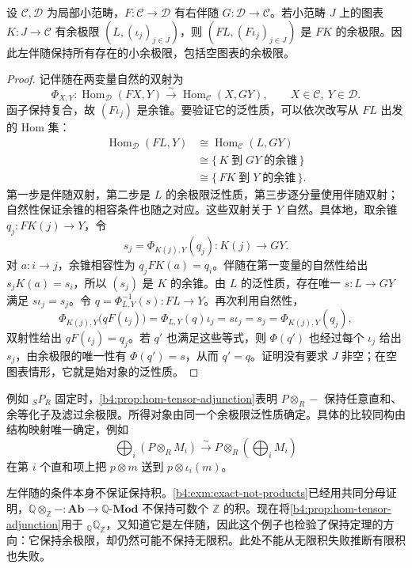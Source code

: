 \begin{theorem}\label{b4:thm:adjoints-preserve-colimits}
	设 \(\mathcal C,\mathcal D\) 为局部小范畴，\(F:\mathcal C\rightarrow\mathcal D\) 有右伴随 \(G:\mathcal D\rightarrow\mathcal C\)。若小范畴 \(J\) 上的图表 \(K:J\rightarrow\mathcal C\) 有余极限 \((L,(\iota_j)_{j\in J})\)，则 \((FL,(F\iota_j)_{j\in J})\) 是 \(FK\) 的余极限。因此左伴随保持所有存在的小余极限，包括空图表的余极限。
\end{theorem}
\begin{proof}
	记伴随在两变量自然的双射为
	\[
		\Phi_{X,Y}:\operatorname{Hom}_{\mathcal D}(FX,Y) \xrightarrow{\sim}\operatorname{Hom}_{\mathcal C}(X,GY), \qquad X\in\mathcal C,\ Y\in\mathcal D.
	\]
	函子保持复合，故 \((F\iota_j)\) 是余锥。要验证它的泛性质，可以依次改写从 \(FL\) 出发的 Hom 集：
	\[
		\begin{aligned}
			\operatorname{Hom}_{\mathcal D}(FL,Y) &\cong\operatorname{Hom}_{\mathcal C}(L,GY)\\
			&\cong\{\,K\;\text{到}\;GY\;\text{的余锥}\,\}\\
			&\cong\{\,FK\;\text{到}\;Y\;\text{的余锥}\,\}.
		\end{aligned}
	\]
	第一步是伴随双射，第二步是 \(L\) 的余极限泛性质，第三步逐分量使用伴随双射；自然性保证余锥的相容条件也随之对应。这些双射关于 \(Y\) 自然。具体地，取余锥 \(q_j:FK(j)\rightarrow Y\)，令
	\[
		s_j=\Phi_{K(j),Y}(q_j):K(j)\longrightarrow GY.
	\]
	对 \(a:i\rightarrow j\)，余锥相容性为 \(q_jFK(a)=q_i\)。伴随在第一变量的自然性给出 \(s_jK(a)=s_i\)，所以 \((s_j)\) 是 \(K\) 的余锥。由 \(L\) 的泛性质，存在唯一 \(s:L\rightarrow GY\) 满足 \(s\iota_j=s_j\)。令 \(q=\Phi^{-1}_{L,Y}(s):FL\rightarrow Y\)。再次利用自然性，
	\[
		\Phi_{K(j),Y}\bigl(qF(\iota_j)\bigr) =\Phi_{L,Y}(q)\iota_j=s\iota_j=s_j=\Phi_{K(j),Y}(q_j),
	\]
	双射性给出 \(qF(\iota_j)=q_j\)。若 \(q'\) 也满足这些等式，则 \(\Phi(q')\) 也经过每个 \(\iota_j\) 给出 \(s_j\)，由余极限的唯一性有 \(\Phi(q')=s\)，从而 \(q'=q\)。证明没有要求 \(J\) 非空；在空图表情形，它就是始对象的泛性质。
\end{proof}

例如 \({}_SP_R\) 固定时，\cref{b4:prop:hom-tensor-adjunction}表明 \(P\otimes_R-\) 保持任意直和、余等化子及滤过余极限。所得对象由同一个余极限泛性质确定。具体的比较同构由结构映射唯一确定，例如
\[
	\bigoplus_i(P\otimes_RM_i)\xrightarrow{\sim}P\otimes_R\left(\bigoplus_iM_i\right)
\]
在第 \(i\) 个直和项上把 \(p\otimes m\) 送到 \(p\otimes\iota_i(m)\)。

\ProseParagraphBreak
左伴随的条件本身不保证保持积。\cref{b4:exm:exact-not-products}已经用共同分母证明，\(\mathbb Q\otimes_{\mathbb Z}-:\mathbf{Ab}\rightarrow\mathbb Q\text{-}\mathbf{Mod}\) 不保持可数个 \(\mathbb Z\) 的积。现在将\cref{b4:prop:hom-tensor-adjunction}用于 \({}_{\mathbb Q}\mathbb Q_{\mathbb Z}\)，又知道它是左伴随，因此这个例子也检验了保持定理的方向：它保持余极限，却仍然可能不保持无限积。此处不能从无限积失败推断有限积也失败。


